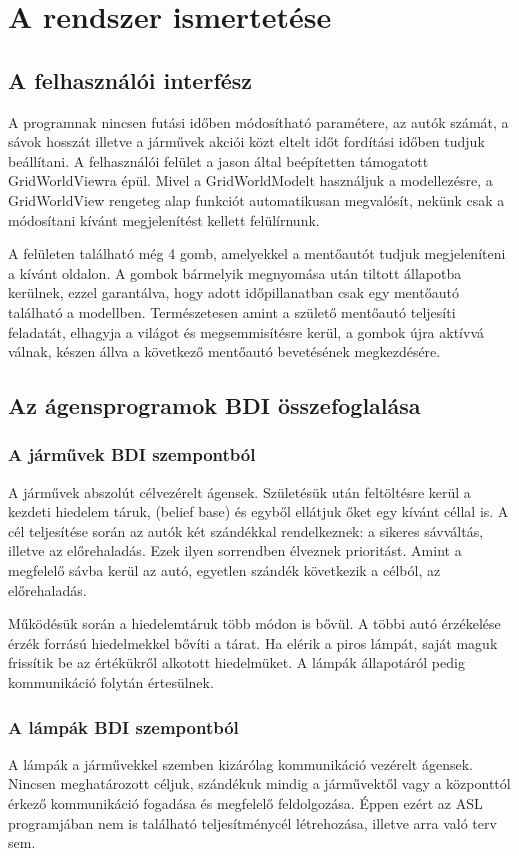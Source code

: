 \documentclass[a4paper, 11pt]{article}
\begin{document}
\section{A rendszer ismertetése}
\subsection{A felhasználói interfész}
A programnak nincsen futási időben módosítható paramétere, az autók számát, a sávok hosszát illetve a
járművek akciói közt eltelt időt fordítási időben tudjuk beállítani.
A felhasználói felület a jason által beépítetten támogatott GridWorldViewra épül. Mivel a GridWorldModelt
használjuk a modellezésre, a GridWorldView rengeteg alap funkciót automatikusan megvalósít, nekünk csak
a módosítani kívánt megjelenítést kellett felülírnunk.

A felületen található még 4 gomb, amelyekkel a mentőautót tudjuk megjeleníteni a kívánt oldalon. A gombok
bármelyik megnyomása után tiltott állapotba kerülnek, ezzel garantálva, hogy adott időpillanatban
csak egy mentőautó található a modellben. Természetesen amint a születő mentőautó teljesíti feladatát,
elhagyja a világot és megsemmisítésre kerül, a gombok újra aktívvá válnak, készen állva a következő
mentőautó bevetésének megkezdésére.
\subsection{Az ágensprogramok BDI összefoglalása}
\subsubsection{A járművek BDI szempontból}
A járművek abszolút célvezérelt ágensek. Születésük után feltöltésre kerül a kezdeti hiedelem táruk,
(belief base) és egyből ellátjuk őket egy kívánt céllal is. A cél teljesítése során az autók két szándékkal
rendelkeznek: a sikeres sávváltás, illetve az előrehaladás. Ezek ilyen sorrendben élveznek prioritást.
Amint a megfelelő sávba kerül az autó, egyetlen szándék következik a célból, az előrehaladás.

Működésük során a hiedelemtáruk több módon is bővül. A többi autó érzékelése érzék forrású hiedelmekkel
bővíti a tárat. Ha elérik a piros lámpát, saját maguk frissítik be az értékükről alkotott hiedelmüket.
A lámpák állapotáról pedig kommunikáció folytán értesülnek.

\subsubsection{A lámpák BDI szempontból}
A lámpák a járművekkel szemben kizárólag kommunikáció vezérelt ágensek. Nincsen meghatározott céljuk,
szándékuk mindig a járművektől vagy a központtól érkező kommunikáció fogadása és megfelelő feldolgozása.
Éppen ezért az ASL programjában nem is található teljesítménycél létrehozása, illetve arra való terv sem.
\end{document}
